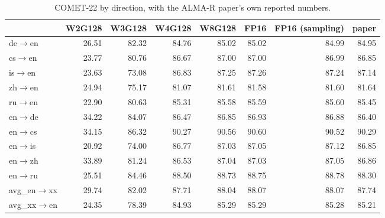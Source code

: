\begin{table}[t]
\centering
\small
\begin{tabular}{lrrrrrrr}
\toprule
& W2G128 & W3G128 & W4G128 & W8G128 & FP16 & FP16 (sampling) & paper \\
\midrule
de$\rightarrow$en & 26.51 & 82.32 & 84.76 & 85.02 & 85.02 & 84.99 & 84.95 \\
cs$\rightarrow$en & 23.77 & 80.76 & 86.67 & 87.00 & 87.00 & 86.99 & 86.85 \\
is$\rightarrow$en & 23.63 & 73.08 & 86.83 & 87.25 & 87.26 & 87.24 & 87.14 \\
zh$\rightarrow$en & 24.94 & 75.17 & 81.07 & 81.61 & 81.58 & 81.60 & 81.64 \\
ru$\rightarrow$en & 22.90 & 80.63 & 85.31 & 85.58 & 85.59 & 85.60 & 85.45 \\
en$\rightarrow$de & 34.22 & 84.07 & 86.47 & 86.85 & 86.93 & 86.88 & 86.40 \\
en$\rightarrow$cs & 34.15 & 86.32 & 90.27 & 90.56 & 90.60 & 90.52 & 90.29 \\
en$\rightarrow$is & 20.92 & 74.00 & 86.77 & 87.03 & 87.05 & 87.12 & 86.85 \\
en$\rightarrow$zh & 33.89 & 81.24 & 86.53 & 87.04 & 87.03 & 87.05 & 86.86 \\
en$\rightarrow$ru & 25.51 & 84.46 & 88.50 & 88.73 & 88.75 & 88.78 & 88.30 \\
\midrule
avg\_en$\rightarrow$xx & 29.74 & 82.02 & 87.71 & 88.04 & 88.07 & 88.07 & 87.74 \\
avg\_xx$\rightarrow$en & 24.35 & 78.39 & 84.93 & 85.29 & 85.29 & 85.28 & 85.21 \\
\bottomrule
\end{tabular}
\caption{COMET-22 by direction, with the ALMA-R paper's own reported numbers.}
\label{tab:comet-22}
\end{table}

